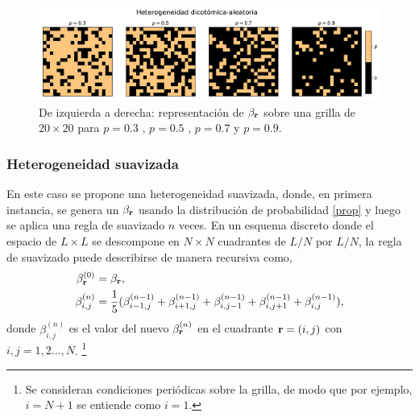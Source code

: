 \begin{figure}
  \centering
  \includegraphics[width=1\textwidth]{heterogeneidad_dicot_aleatoria.pdf}
  \caption{De izquierda a derecha: representación de $\beta_{\vb r}$ sobre una grilla de $20 \times 20$ para  $p=0.3$ , $p=0.5$ , $p=0.7$ y $p=0.9$.}
  \label{fig:heterogeneidad_dicotómica_aleatoria}
\end{figure}


\subsubsection*{Heterogeneidad suavizada}

En este caso se propone una heterogeneidad suavizada, donde, en primera instancia, se genera un $\beta_{\vb r}$ usando la distribución
de probabilidad \ref{prop} y luego se aplica una regla de suavizado $n$ veces. En un esquema discreto donde el espacio de $L\times L$ se descompone en
$N\times N$ cuadrantes de $L/N$ por $L/N$, la regla de suavizado puede describirse de manera recursiva como,
\begin{align}
  \beta^{(0)}_{\vb r} &= \beta_{\vb r},\\ 
  \beta^{(n)}_{i,j} &= \frac{1}{5} (\beta^{(n-1)}_{i-1,j} + \beta^{(n-1)}_{i+1,j} + \beta^{(n-1)}_{i,j-1} + \beta^{(n-1)}_{i,j+1} + \beta^{(n-1)}_{i,j}),\label{suavizado}
\end{align}
donde $\beta^{(n)}_{i,j}$ es el valor del nuevo $\beta^{(n)}_{\vb r}$ en el cuadrante $\vb r =(i,j)$ con $i,j = 1,2...,N$.
\footnote{Se consideran condiciones periódicas sobre la grilla, de modo que por ejemplo, $i=N+1$ se entiende como $i=1$.} 

